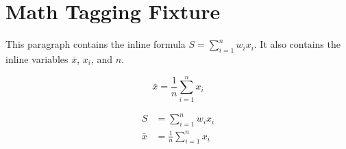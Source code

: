 \documentclass{../ndsudisq}
\numberwithin{equation}{chapter}
\begin{document}
\makefrontmatter
\mainmattersetup

\chapter{Math Tagging Fixture}
\label{chap:math-tagging-fixture}

This paragraph contains the inline formula \(S=\sum_{i=1}^{n} w_i x_i\).
It also contains the inline variables \(\bar{x}\), \(x_i\), and \(n\).

\begin{equation}
\bar{x}=\frac{1}{n}\sum_{i=1}^{n}x_i
\end{equation}

\begin{align}
S &= \sum_{i=1}^{n} w_i x_i \\
\bar{x} &= \frac{1}{n}\sum_{i=1}^{n}x_i
\end{align}
\end{document}
